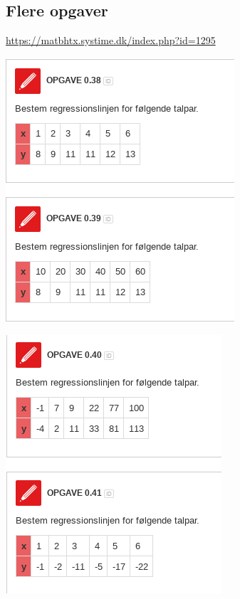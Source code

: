 \documentclass[11pt]{article}
\begin{document}
\subsection*{Flere opgaver}
\label{sec:orga626851}
\url{https://matbhtx.systime.dk/index.php?id=1295}

\begin{center}
\includegraphics[width=.9\linewidth]{img/screenshot_2019-09-05_11-18-40.png}
\end{center}
\begin{center}
\includegraphics[width=.9\linewidth]{img/screenshot_2019-09-05_11-18-52.png}
\end{center}
\end{document}

